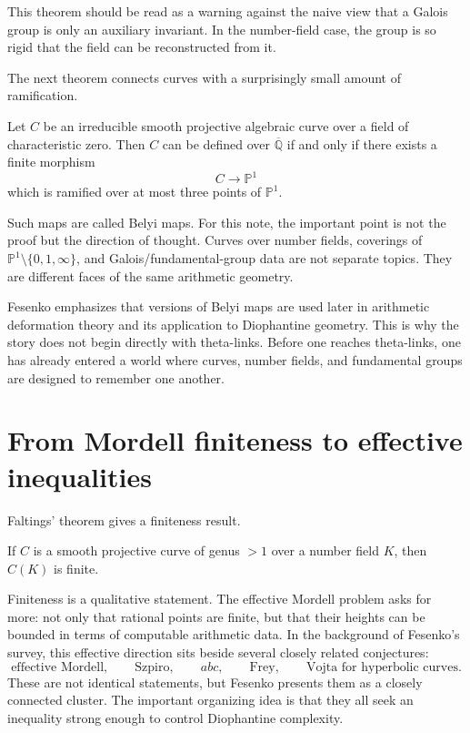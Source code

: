This theorem should be read as a warning against the naive view that a Galois group is only an auxiliary invariant.  In the number-field case, the group is so rigid that the field can be reconstructed from it.

The next theorem connects curves with a surprisingly small amount of ramification.

\begin{theorem}[Belyi]
Let \(C\) be an irreducible smooth projective algebraic curve over a field of characteristic zero.  Then \(C\) can be defined over \(\overline{\mathbb Q}\) if and only if there exists a finite morphism
\[
  C\longrightarrow \mathbb P^1
\]
which is ramified over at most three points of \(\mathbb P^1\).
\end{theorem}

Such maps are called Belyi maps.  For this note, the important point is not the proof but the direction of thought.  Curves over number fields, coverings of \(\mathbb P^1\setminus\{0,1,\infty\}\), and Galois/fundamental-group data are not separate topics.  They are different faces of the same arithmetic geometry.

\begin{remark}
Fesenko emphasizes that versions of Belyi maps are used later in arithmetic deformation theory and its application to Diophantine geometry.  This is why the story does not begin directly with theta-links.  Before one reaches theta-links, one has already entered a world where curves, number fields, and fundamental groups are designed to remember one another.
\end{remark}

\section{From Mordell finiteness to effective inequalities}

Faltings' theorem gives a finiteness result.

\begin{theorem}
If \(C\) is a smooth projective curve of genus \(>1\) over a number field \(K\), then \(C(K)\) is finite.
\end{theorem}

Finiteness is a qualitative statement.  The effective Mordell problem asks for more: not only that rational points are finite, but that their heights can be bounded in terms of computable arithmetic data.  In the background of Fesenko's survey, this effective direction sits beside several closely related conjectures:
\[
  \text{effective Mordell},\qquad
  \text{Szpiro},\qquad
  abc,\qquad
  \text{Frey},\qquad
  \text{Vojta for hyperbolic curves}.
\]
These are not identical statements, but Fesenko presents them as a closely connected cluster.  The important organizing idea is that they all seek an inequality strong enough to control Diophantine complexity.

